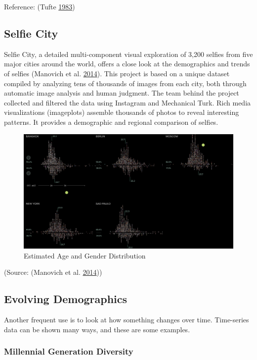 \documentclass[]{book}
\begin{document}
Reference: (Tufte \protect\hyperlink{ref-visual_display}{1983})

\subsection{Selfie City}\label{selfie-city}

Selfie City, a detailed multi-component visual exploration of 3,200
selfies from five major cities around the world, offers a close look at
the demographics and trends of selfies (Manovich et al.
\protect\hyperlink{ref-selfie}{2014}). This project is based on a unique
dataset compiled by analyzing tens of thousands of images from each
city, both through automatic image analysis and human judgment. The team
behind the project collected and filtered the data using Instagram and
Mechanical Turk. Rich media visualizations (imageplots) assemble
thousands of photos to reveal interesting patterns. It provides a
demographic and regional comparison of selfies.

\begin{figure}
\centering
\includegraphics{images/selfie_age_gender.png}
\caption{Estimated Age and Gender Distribution}
\end{figure}

(Source: (Manovich et al. \protect\hyperlink{ref-selfie}{2014}))

\subsection{Evolving Demographics}\label{evolving-demographics}

Another frequent use is to look at how something changes over time.
Time-series data can be shown many ways, and these are some examples.

\subsubsection{Millennial Generation
Diversity}\label{millennial-generation-diversity}
\end{document}
